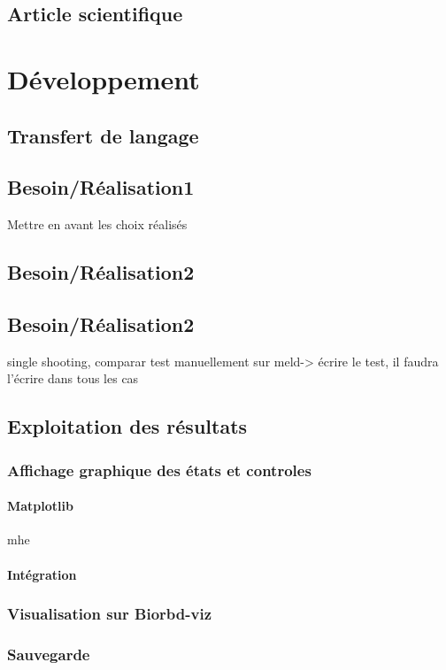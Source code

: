        \section{Article scientifique}
    \chapter{Développement}
        \section{Transfert de langage}
        \section{Besoin/Réalisation1}
Mettre en avant les choix réalisés
        \section{Besoin/Réalisation2}
        \section{Besoin/Réalisation2}
single shooting, comparar test manuellement sur meld-> écrire le test, il faudra l'écrire dans tous les cas
        \section{Exploitation des résultats}
            \subsection{Affichage graphique des états et controles}
                \subsubsection{Matplotlib}
                \gls{mhe}
                \subsubsection{Intégration}
            \subsection{Visualisation sur Biorbd-viz}
            \subsection{Sauvegarde}
